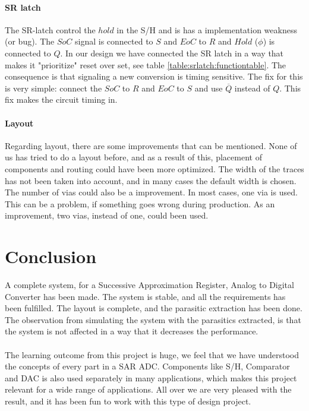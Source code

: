 \documentclass[english, 12pt, a4paper]{ifimaster}
\begin{document}
\subsubsection{SR latch}
The SR-latch control the \(hold\) in the S/H and is has a implementation weakness (or bug). The \(SoC\) signal is connected to \(S\) and \(EoC\) to  \(R\) and \(Hold\) (\(\phi\)) is connected to \(Q\). 
In our design we have connected the SR latch in a way that makes it "prioritize" reset over set, see table \ref{table:srlatch:functiontable}.
The consequence is that signaling a new conversion is timing sensitive.
The fix for this is very simple: connect the \(SoC\) to \(R\) and \(EoC\) to \(S\) and use \(\overline{Q}\) instead of \(Q\). This fix makes the circuit timing in.

\subsubsection{Layout}
Regarding layout, there are some improvements that can be mentioned. None of us has tried to do a layout before, and as a result of this, placement of components and 
routing could have been more optimized. The width of the traces has not been taken into account, and in many cases the default width is chosen. The number of vias could also be a 
improvement. In most cases, one via is used. This can be a problem, if something goes wrong during production. As an improvement, two vias, instead of one, could been used. 

\chapter{Conclusion}
A complete system, for a Successive Approximation Register, Analog to Digital Converter has been 
made. The system is stable, and all the requirements has been fulfilled. The layout is complete, 
and the parasitic extraction has been done. The observation from simulating the system with the
parasitics extracted, is that the system is not affected in a way that it decreases the performance.\\
\\
The learning outcome from this project is huge, we feel that we have understood the concepts
of every part in a SAR ADC. Components like S/H, Comparator and DAC is also used separately in many
applications, which makes this project relevant for a wide range of applications. All over we 
are very pleased with the result, and it has been fun to work with this type of design project. 
\end{document}

